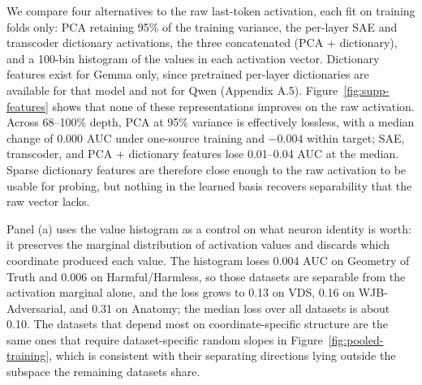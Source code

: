 
We compare four alternatives to the raw last-token activation, each fit on
training folds only: PCA retaining 95\% of the training variance, the per-layer
SAE and transcoder dictionary activations, the three concatenated (PCA +
dictionary), and a 100-bin histogram of the values in each activation vector.
Dictionary features exist for Gemma only, since pretrained per-layer
dictionaries are available for that model and not for Qwen (Appendix A.5).
Figure~\ref{fig:supp-features} shows that none of these representations
improves on the raw activation. Across 68--100\% depth, PCA at 95\% variance is
effectively lossless, with a median change of 0.000 AUC under one-source
training and $-0.004$ within target; SAE, transcoder, and PCA + dictionary
features lose 0.01--0.04 AUC at the median. Sparse dictionary features are
therefore close enough to the raw activation to be usable for probing, but
nothing in the learned basis recovers separability that the raw vector lacks.

Panel (a) uses the value histogram as a control on what neuron identity is
worth: it preserves the marginal distribution of activation values and discards
which coordinate produced each value. The histogram loses 0.004 AUC on Geometry
of Truth and 0.006 on Harmful/Harmless, so those datasets are separable from
the activation marginal alone, and the loss grows to 0.13 on VDS, 0.16 on
WJB-Adversarial, and 0.31 on Anatomy; the median loss over all datasets is
about 0.10. The datasets that depend most on coordinate-specific structure are
the same ones that require dataset-specific random slopes in
Figure~\ref{fig:pooled-training}, which is consistent with their separating
directions lying outside the subspace the remaining datasets share.




